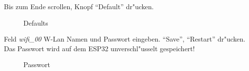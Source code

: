 \documentclass[ngerman,11pt,parskip=half] {scrartcl}
\begin{document}
Bis zum Ende scrollen, Knopf "`Default"' dr"ucken.

\begin{figure}[H]
\centering
{}
\caption{Defaults} \label{fig:1}
\end{figure}

Feld \emph{wifi\_00} W-Lan Namen und Passwort eingeben. "`Save"', "`Restart"' dr"ucken. Das Passwort wird auf dem ESP32 unverschl"usselt gespeichert!

\begin{figure}[H]
\centering
{}
\caption{Passwort} \label{fig:1}
\end{figure}
\end{document}
